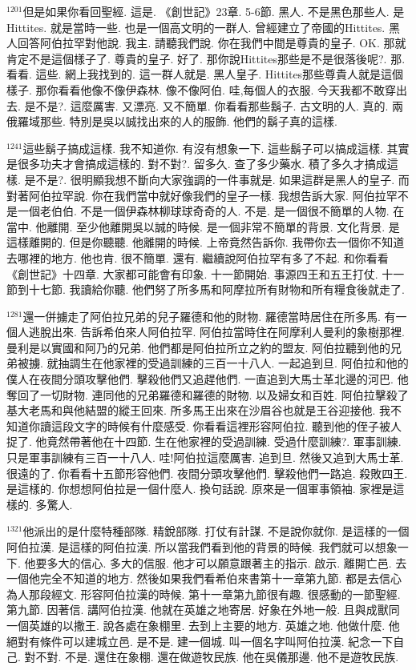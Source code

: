 \documentclass{book}
\begin{document}
$^{1201}$但是如果你看回聖經.
這是.
《創世記》23章.
5-6節.
黑人.
不是黑色那些人.
是Hittites.
就是當時一些.
也是一個高文明的一群人.
曾經建立了帝國的Hittites.
黑人回答阿伯拉罕對他說.
我主.
請聽我們說.
你在我們中間是尊貴的皇子.
OK.
那就肯定不是這個樣子了.
尊貴的皇子.
好了.
那你說Hittites那些是不是很落後呢?.
那.
看看.
這些.
網上我找到的.
這一群人就是.
黑人皇子.
Hittites那些尊貴人就是這個樣子.
那你看看他像不像伊森林.
像不像阿伯.
哇,每個人的衣服.
今天我都不敢穿出去.
是不是?.
這麼厲害.
又漂亮.
又不簡單.
你看看那些鬍子.
古文明的人.
真的.
兩俄羅域那些.
特別是吳以誠找出來的人的服飾.
他們的鬍子真的這樣.

$^{1241}$這些鬍子搞成這樣.
我不知道你.
有沒有想象一下.
這些鬍子可以搞成這樣.
其實是很多功夫才會搞成這樣的.
對不對?.
留多久.
查了多少藥水.
積了多久才搞成這樣.
是不是?.
很明顯我想不斷向大家強調的一件事就是.
如果這群是黑人的皇子.
而對著阿伯拉罕說.
你在我們當中就好像我們的皇子一樣.
我想告訴大家.
阿伯拉罕不是一個老伯伯.
不是一個伊森林柳球球奇奇的人.
不是.
是一個很不簡單的人物.
在當中.
他離開.
至少他離開吳以誠的時候.
是一個非常不簡單的背景.
文化背景.
是這樣離開的.
但是你聽聽.
他離開的時候.
上帝竟然告訴你.
我帶你去一個你不知道去哪裡的地方.
他也肯.
很不簡單.
還有.
繼續說阿伯拉罕有多了不起.
和你看看《創世記》十四章.
大家都可能會有印象.
十一節開始.
事源四王和五王打仗.
十一節到十七節.
我讀給你聽.
他們努了所多馬和阿摩拉所有財物和所有糧食後就走了.

$^{1281}$還一併擄走了阿伯拉兄弟的兒子羅德和他的財物.
羅德當時居住在所多馬.
有一個人逃脫出來.
告訴希伯來人阿伯拉罕.
阿伯拉當時住在阿摩利人曼利的象樹那裡.
曼利是以實國和阿乃的兄弟.
他們都是阿伯拉所立之約的盟友.
阿伯拉聽到他的兄弟被擄.
就抽調生在他家裡的受過訓練的三百一十八人.
一起追到旦.
阿伯拉和他的僕人在夜間分頭攻擊他們.
擊殺他們又追趕他們.
一直追到大馬士革北邊的河巴.
他奪回了一切財物.
連同他的兄弟羅德和羅德的財物.
以及婦女和百姓.
阿伯拉擊殺了基大老馬和與他結盟的縱王回來.
所多馬王出來在沙眉谷也就是王谷迎接他.
我不知道你讀這段文字的時候有什麼感受.
你看看這裡形容阿伯拉.
聽到他的侄子被人捉了.
他竟然帶著他在十四節.
生在他家裡的受過訓練.
受過什麼訓練?.
軍事訓練.
只是軍事訓練有三百一十八人.
哇!阿伯拉這麼厲害.
追到旦.
然後又追到大馬士革.
很遠的了.
你看看十五節形容他們.
夜間分頭攻擊他們.
擊殺他們一路追.
殺敗四王.
是這樣的.
你想想阿伯拉是一個什麼人.
換句話說.
原來是一個軍事領袖.
家裡是這樣的.
多驚人.

$^{1321}$他派出的是什麼特種部隊.
精銳部隊.
打仗有計謀.
不是說你就你.
是這樣的一個阿伯拉漢.
是這樣的阿伯拉漢.
所以當我們看到他的背景的時候.
我們就可以想象一下.
他要多大的信心.
多大的信服.
他才可以願意跟著主的指示.
啟示.
離開亡邑.
去一個他完全不知道的地方.
然後如果我們看希伯來書第十一章第九節.
都是去信心為人那段經文.
形容阿伯拉漢的時候.
第十一章第九節很有趣.
很感動的一節聖經.
第九節.
因著信.
講阿伯拉漢.
他就在英雄之地寄居.
好象在外地一般.
且與成獸同一個英雄的以撒王.
說各處在象棚里.
去到上主要的地方.
英雄之地.
他做什麼.
他絕對有條件可以建城立邑.
是不是.
建一個城.
叫一個名字叫阿伯拉漢.
紀念一下自己.
對不對.
不是.
還住在象棚.
還在做遊牧民族.
他在吳儀那邊.
他不是遊牧民族.
\end{document}

